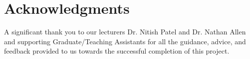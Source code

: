 \documentclass[conference]{IEEEtran}
\begin{document}
\section*{Acknowledgments}

A significant thank you to our lecturers Dr. Nitish Patel and Dr. Nathan Allen and supporting Graduate/Teaching Assistants for all the guidance, advice, and feedback provided to us towards the successful completion of this project.




% 
% 



\appendix

\end{document}
